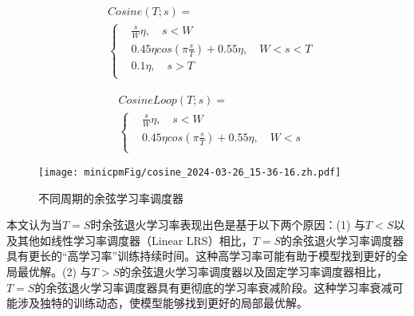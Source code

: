 \begin{figure}[htbp]
    \centering
    \begin{minipage}{0.47\linewidth}
        \begin{equation*}
    \begin{aligned}
    & Cosine(T; s) = \\
    & \begin{cases}
       & \frac{s}{W} \eta, \quad s<W \\
       & 0.45\eta cos(\pi \frac{s}{T}) + 0.55\eta, \quad W < s < T \\
       & 0.1\eta,\quad  s > T \\
    \end{cases}
\end{aligned}
        \end{equation*}
    \end{minipage}
    \hfill %
    \begin{minipage}{0.52\linewidth}
             \begin{equation*}
    \begin{aligned}
    & CosineLoop(T; s) = \\
    & \begin{cases}
       & \frac{s}{W} \eta, \quad s<W \\
       & 0.45\eta cos(\pi \frac{s}{T}) + 0.55\eta, \quad W < s  \\
    \end{cases}
\end{aligned}
        \end{equation*}
    \end{minipage}
\end{figure}

\begin{figure}
    \centering
    \texttt{[image: minicpmFig/cosine\_2024-03-26\_15-36-16.zh.pdf]}
    \caption{不同周期的余弦学习率调度器}
    \label{fig:cosine_lr}
    \vspace{0.47cm}
\end{figure}

本文认为当$T = S$时余弦退火学习率表现出色是基于以下两个原因：(1) 与$T < S$以及其他如线性学习率调度器（Linear LRS）相比，$T = S$的余弦退火学习率调度器具有更长的“高学习率”训练持续时间。这种高学习率可能有助于模型找到更好的全局最优解。(2) 与$T > S$的余弦退火学习率调度器以及固定学习率调度器相比，$T = S$的余弦退火学习率调度器具有更彻底的学习率衰减阶段。这种学习率衰减可能涉及独特的训练动态，使模型能够找到更好的局部最优解。

